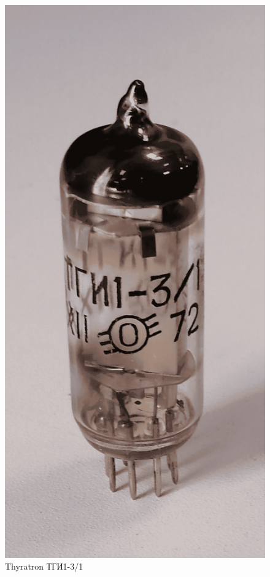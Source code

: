 \documentclass{beamer}
\begin{document}
\begin{frame}
\begin{columns}
\begin{figure}
				\includegraphics[width=\linewidth]{res/tirat_ar.png}
				\caption*{Thyratron ТГИ1-3/1}
			\end{figure}
		\end{columns}
	\end{frame}	
	
\end{document}
